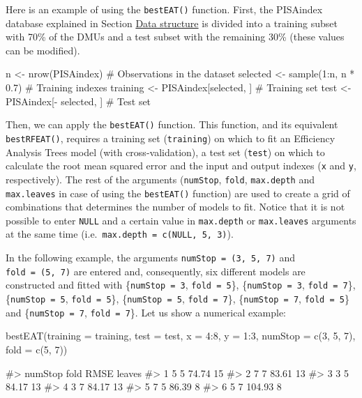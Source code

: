 Here is an example of using the \texttt{bestEAT()} function. First, the
PISAindex database explained in Section
\protect\hyperlink{section3}{Data structure} is divided into a training
subset with 70\% of the DMUs and a test subset with the remaining 30\%
(these values can be modified).

\begin{Schunk}
\begin{Sinput}
n <- nrow(PISAindex)              # Observations in the dataset
selected <- sample(1:n, n * 0.7)  # Training indexes
training <- PISAindex[selected, ] # Training set
test <- PISAindex[- selected, ]   # Test set
\end{Sinput}
\end{Schunk}

Then, we can apply the \texttt{bestEAT()} function. This function, and
its equivalent \texttt{bestRFEAT()}, requires a training set
(\texttt{training}) on which to fit an Efficiency Analysis Trees model
(with cross-validation), a test set (\texttt{test}) on which to
calculate the root mean squared error and the input and output indexes
(\texttt{x} and \texttt{y}, respectively). The rest of the arguments
(\texttt{numStop}, \texttt{fold}, \texttt{max.depth} and
\texttt{max.leaves} in case of using the \texttt{bestEAT()} function)
are used to create a grid of combinations that determines the number of
models to fit. Notice that it is not possible to enter \texttt{NULL} and
a certain value in \texttt{max.depth} or \texttt{max.leaves} arguments
at the same time (i.e.~\texttt{max.depth\ =\ c(NULL,\ 5,\ 3)}).

In the following example, the arguments \texttt{numStop\ =\ (3,\ 5,\ 7)}
and \texttt{fold\ =\ (5,\ 7)} are entered and, consequently, six
different models are constructed and fitted with
\{\texttt{numStop\ =\ 3}, \texttt{fold\ =\ 5}\},
\{\texttt{numStop\ =\ 3}, \texttt{fold\ =\ 7}\},
\{\texttt{numStop\ =\ 5}, \texttt{fold\ =\ 5}\},
\{\texttt{numStop\ =\ 5}, \texttt{fold\ =\ 7}\},
\{\texttt{numStop\ =\ 7}, \texttt{fold\ =\ 5}\} and
\{\texttt{numStop\ =\ 7}, \texttt{fold\ =\ 7}\}. Let us show a numerical
example:

\begin{Schunk}
\begin{Sinput}
bestEAT(training = training, test = test, x = 4:8, y = 1:3, 
        numStop = c(3, 5, 7), fold = c(5, 7))
\end{Sinput}
\begin{Soutput}
#>   numStop fold   RMSE leaves
#> 1       5    5  74.74     15
#> 2       7    7  83.61     13
#> 3       3    5  84.17     13
#> 4       3    7  84.17     13
#> 5       7    5  86.39      8
#> 6       5    7 104.93      8
\end{Soutput}
\end{Schunk}

